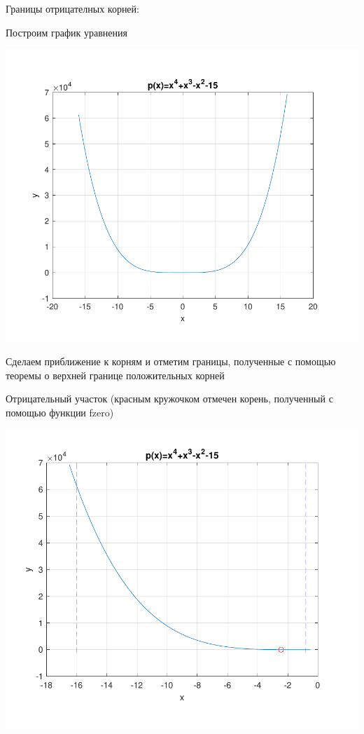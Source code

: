 Границы отрицателных корней: 
\begin{math} 
	[-16;-0,79]
\end{math}

Построим график уравнения

\includegraphics[scale=0.75]{1.pdf}

Сделаем приближение к корням и отметим границы, полученные с помощью теоремы о верхней границе положительных корней

Отрицательный участок (красным кружочком отмечен корень, полученный с помощью функции fzero)

\includegraphics[scale=0.75]{2.pdf}

